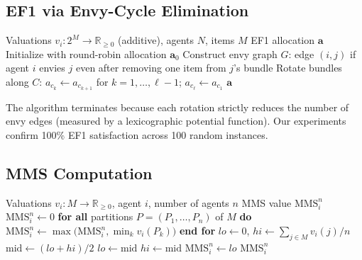 \documentclass[10pt]{article}
\begin{document}
\subsection{EF1 via Envy-Cycle Elimination}
\label{app:ef1}

\begin{algorithm}[H]
\caption{EF1 Allocation via Envy-Cycle Elimination}
\label{alg:ef1}
\begin{algorithmic}[1]
\REQUIRE Valuations $v_i: 2^M \to \mathbb{R}_{\geq 0}$ (additive), agents $N$, items $M$
\ENSURE EF1 allocation $\mathbf{a}$
\STATE Initialize with round-robin allocation $\mathbf{a}_0$
\REPEAT
  \STATE Construct envy graph $G$: edge $(i,j)$ if agent $i$ envies $j$ even after removing one item from $j$'s bundle
    \STATE Rotate bundles along $C$: $a_{c_k} \leftarrow a_{c_{k+1}}$ for $k = 1, \ldots, \ell-1$; $a_{c_\ell} \leftarrow a_{c_1}$
  \ENDIF
{}
\RETURN $\mathbf{a}$
\end{algorithmic}
\end{algorithm}

The algorithm terminates because each rotation strictly reduces the number of envy edges (measured by a lexicographic potential function). Our experiments confirm 100\% EF1 satisfaction across 100 random instances.

\subsection{MMS Computation}
\label{app:mms}

\begin{algorithm}[H]
\caption{Maximin Share (MMS) Computation}
\label{alg:mms}
\begin{algorithmic}[1]
\REQUIRE Valuations $v_i: M \to \mathbb{R}_{\geq 0}$, agent $i$, number of agents $n$
\ENSURE MMS value $\text{MMS}_i^n$
\STATE $\text{MMS}_i^n \leftarrow 0$
  \STATE {}
  \STATE \textbf{for all} partitions $P = (P_1, \ldots, P_n)$ of $M$ \textbf{do}
    \STATE \quad $\text{MMS}_i^n \leftarrow \max\!\bigl(\text{MMS}_i^n, \min_{k} v_i(P_k)\bigr)$
  \STATE \textbf{end for}
\ELSE
  \STATE {}
  \STATE $lo \leftarrow 0$, $hi \leftarrow \sum_{j \in M} v_i(j) / n$
    \STATE $\text{mid} \leftarrow (lo + hi)/2$
      \STATE $lo \leftarrow \text{mid}$
    \ELSE
      \STATE $hi \leftarrow \text{mid}$
    \ENDIF
  \ENDFOR
  \STATE $\text{MMS}_i^n \leftarrow lo$
\ENDIF
\RETURN $\text{MMS}_i^n$
\end{algorithmic}
\end{algorithm}
\end{document}
